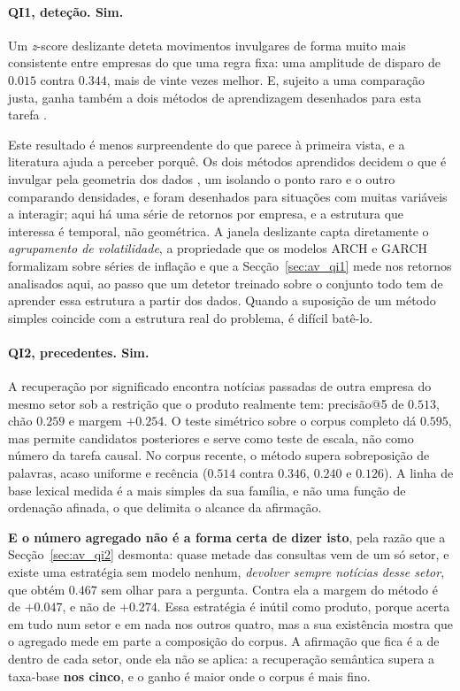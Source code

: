 \paragraph{QI1, deteção. Sim.}
Um \emph{z}-score deslizante deteta movimentos invulgares de forma muito mais consistente entre
empresas do que uma regra fixa: uma amplitude de disparo de $0.015$ contra $0.344$, mais de vinte
vezes melhor. E, sujeito a uma comparação justa, ganha também a dois métodos de aprendizagem
desenhados para esta tarefa \autocite{liu2008isolation, breunig2000lof}.

Este resultado é menos surpreendente do que parece à primeira vista, e a literatura ajuda a
perceber porquê. Os dois métodos aprendidos decidem o que é invulgar pela geometria dos dados
\autocite{liu2008isolation, breunig2000lof}, um isolando o ponto raro e o outro comparando
densidades, e foram desenhados para situações com muitas variáveis
a interagir; aqui há uma série de retornos por empresa, e a estrutura que interessa é temporal, não
geométrica. A janela
deslizante capta diretamente o \emph{agrupamento de volatilidade}, a propriedade que os modelos
\gls{ARCH} e \gls{GARCH} formalizam \autocite{engle1982arch, bollerslev1986garch} sobre séries de inflação e que a
Secção~\ref{sec:av_qi1} mede nos retornos analisados aqui, ao passo que um detetor treinado sobre o conjunto
todo tem de aprender essa estrutura a partir dos dados. Quando a suposição de um método simples
coincide com a estrutura real do problema, é difícil batê-lo.

\paragraph{QI2, precedentes. Sim.}
A recuperação por significado encontra notícias passadas de outra empresa do mesmo setor sob a
restrição que o produto realmente tem: precisão@5 de $0.513$, chão $0.259$ e margem $+0.254$. O
teste simétrico sobre o corpus completo dá $0.595$, mas permite candidatos posteriores e serve como
teste de escala, não como número da tarefa causal. No corpus recente, o método supera sobreposição
de palavras, acaso uniforme e recência ($0.514$ contra $0.346$, $0.240$ e $0.126$). A linha de base
lexical medida é a mais simples da sua família, e não uma função de ordenação afinada, o que
delimita o alcance da afirmação.

\textbf{E o número agregado não é a forma certa de dizer isto}, pela razão que a
Secção~\ref{sec:av_qi2} desmonta: quase metade das consultas vem de um só setor, e existe uma
estratégia sem modelo nenhum, \emph{devolver sempre notícias desse setor}, que obtém $0.467$ sem
olhar para a pergunta. Contra ela a margem do método é de $+0.047$, e não de $+0.274$. Essa
estratégia é inútil como produto, porque acerta em tudo num setor e em nada nos outros quatro, mas
a sua existência mostra que o agregado mede em parte a composição do corpus. A afirmação que fica
é a de dentro de cada setor, onde ela não se aplica: a recuperação semântica supera a taxa-base
\textbf{nos cinco}, e o ganho é maior onde o corpus é mais fino.

